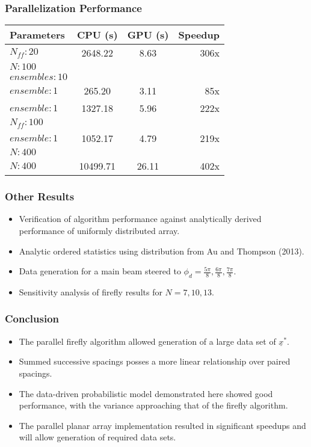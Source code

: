 \documentclass[...]{beamer}
\begin{document}
\begin{frame}
  \frametitle{Parallelization Performance}

  \begin{center}
    \begin{tabular}{| l | c c | r |}
      \hline
      Parameters & CPU (s) & GPU (s) & Speedup \\
      \hline
      $N_{ff}: 20$ & 2648.22 & 8.63 & 306x\\
      $N: 100$ &&&\\
      $ensembles: 10$ &&&\\
      \hline
      $ensemble: 1$ & 265.20 & 3.11 & 85x\\
      \hline
      $ensemble: 1$ & 1327.18 & 5.96 & 222x\\ 
      $N_{ff}: 100$ &&&\\
      \hline
      $ensemble: 1$ & 1052.17 & 4.79 & 219x\\
      $N: 400$ &&&\\
      \hline
      $N: 400$ & 10499.71 & 26.11 & 402x\\
      \hline
    \end{tabular}
  \end{center}

\end{frame}

\begin{frame}
  \frametitle{Other Results}

  \begin{itemize}
    \item Verification of algorithm performance against analytically derived performance of uniformly distributed array.
    \item Analytic ordered statistics using distribution from Au and Thompson (2013)\cite{Au2013}.
    \item Data generation for a main beam steered to $\phi_d=\frac{5\pi}{8},\frac{6\pi}{8},\frac{7\pi}{8}$.
    \item Sensitivity analysis of firefly results for $N=7,10,13$.
  \end{itemize}

\end{frame}

\begin{frame}
  \frametitle{Conclusion}

  \begin{itemize}
    \item The parallel firefly algorithm allowed generation of a large data set of $\underline{x}^*$.
    \item Summed successive spacings posses a more linear relationship over paired spacings.
    \item The data-driven probabilistic model demonstrated here showed good performance, with the variance approaching that of the firefly algorithm.
    \item The parallel planar array implementation resulted in significant speedups and will allow generation of required data sets.
  \end{itemize}

\end{frame}
\end{document}
